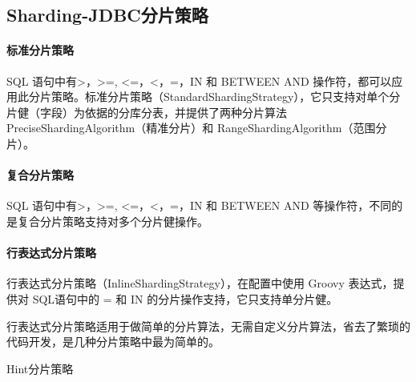 \documentclass[../../../interview-questions.tex]{subfiles}
\begin{document}
\subsection{Sharding-JDBC分片策略}

\paragraph{标准分片策略}

SQL 语句中有>，>=, <=，<，=，IN 和 BETWEEN AND 操作符，都可以应用此分片策略。标准分片策略（StandardShardingStrategy），它只支持对单个分片健（字段）为依据的分库分表，并提供了两种分片算法 PreciseShardingAlgorithm（精准分片）和 RangeShardingAlgorithm（范围分片）。

\paragraph{复合分片策略}

SQL 语句中有>，>=, <=，<，=，IN 和 BETWEEN AND 等操作符，不同的是复合分片策略支持对多个分片健操作。

\paragraph{行表达式分片策略}

行表达式分片策略（InlineShardingStrategy），在配置中使用 Groovy 表达式，提供对 SQL语句中的 = 和 IN 的分片操作支持，它只支持单分片健。

行表达式分片策略适用于做简单的分片算法，无需自定义分片算法，省去了繁琐的代码开发，是几种分片策略中最为简单的。


Hint分片策略
\end{document}
